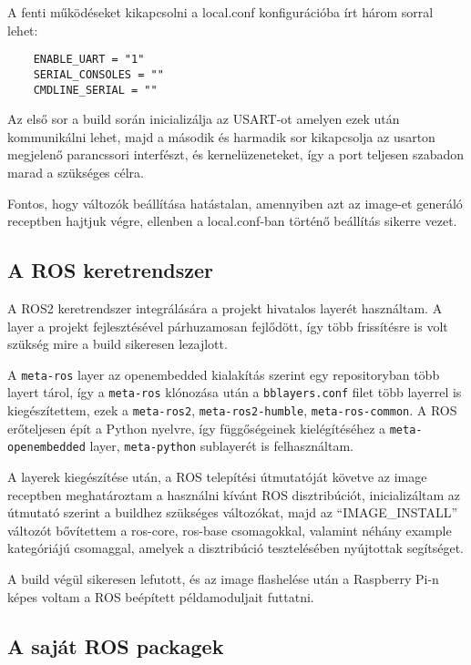 A fenti működéseket kikapcsolni a local.conf konfigurációba írt három sorral
lehet:

\begin{verbatim}
    ENABLE_UART = "1"
    SERIAL_CONSOLES = ""
    CMDLINE_SERIAL = ""
\end{verbatim}

Az első sor a build során inicializálja az USART-ot amelyen ezek után
kommunikálni lehet, majd a második és harmadik sor kikapcsolja az usarton
megjelenő parancssori interfészt, és kernelüzeneteket, így a port teljesen
szabadon marad a szükséges célra.

Fontos, hogy változók beállítása hatástalan, amennyiben azt az image-et generáló
receptben hajtjuk végre, ellenben a local.conf-ban történő beállítás sikerre
vezet. 

\subsection{A ROS keretrendszer}

A ROS2 keretrendszer integrálására a projekt hivatalos layerét használtam. A
layer a projekt fejlesztésével párhuzamosan fejlődött, így több frissítésre is
volt szükség mire a build sikeresen lezajlott.

A \verb|meta-ros| layer az openembedded kialakítás szerint egy repositoryban több
layert tárol, így a \verb|meta-ros| klónozása után a \verb|bblayers.conf| filet
több layerrel is kiegészítettem, ezek a \verb|meta-ros2|,
\verb|meta-ros2-humble|, \verb|meta-ros-common|. A ROS erőteljesen épít a Python
nyelvre, így függőségeinek kielégítéséhez a \verb|meta-openembedded| layer,
\verb|meta-python| sublayerét is felhasználtam.

A layerek kiegészítése után, a ROS telepítési útmutatóját követve az image
receptben meghatároztam a használni kívánt ROS disztribúciót, inicializáltam az
útmutató szerint a buildhez szükséges változókat, majd az ``IMAGE\_INSTALL''
változót bővítettem a ros-core, ros-base csomagokkal, valamint néhány example
kategóriájú csomaggal, amelyek a disztribúció tesztelésében nyújtottak
segítséget.

A build végül sikeresen lefutott, és az image flashelése után a Raspberry Pi-n
képes voltam a ROS beépített példamoduljait futtatni. 

\subsection{A saját ROS packagek}

